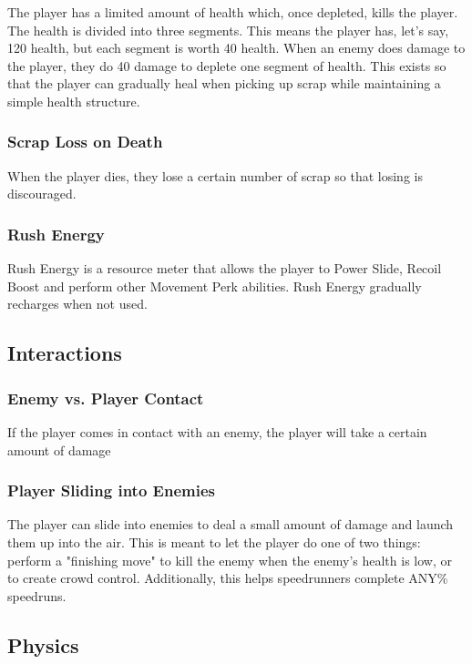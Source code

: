 \documentclass[12pt]{article}
\begin{document}
The player has a limited amount of health which, once depleted, kills the player. The health is divided into three segments. This means the player has, let's say, 120 health, but each segment is worth 40 health. When an enemy does damage to the player, they do 40 damage to deplete one segment of health. This exists so that the player can gradually heal when picking up scrap while maintaining a simple health structure. 

\subsubsection{Scrap Loss on Death}

When the player dies, they lose a certain number of scrap so that losing is discouraged.

\subsubsection{Rush Energy}

Rush Energy is a resource meter that allows the player to Power Slide, Recoil Boost and perform other Movement Perk abilities. Rush Energy gradually recharges when not used. 

\subsection{Interactions}

\subsubsection{Enemy vs. Player Contact}

If the player comes in contact with an enemy, the player will take a certain amount of damage

\subsubsection{Player Sliding into Enemies}

The player can slide into enemies to deal a small amount of damage and launch them up into the air. This is meant to let the player do one of two things: perform a "finishing move" to kill the enemy when the enemy's health is low, or to create crowd control. Additionally, this helps speedrunners complete ANY\% speedruns. 

\subsection{Physics}
\end{document}
